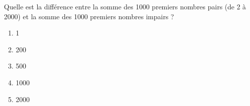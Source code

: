 Quelle est la différence entre la somme des 1000 premiers nombres
pairs (de 2 à 2000) et la somme des 1000 premiers nombres impairs ?
\begin{multicols}{5}
  \begin{enumerate}[A/]
  \item 1
  \item 200
  \item 500
  \item 1000
  \item 2000
  \end{enumerate}
\end{multicols}